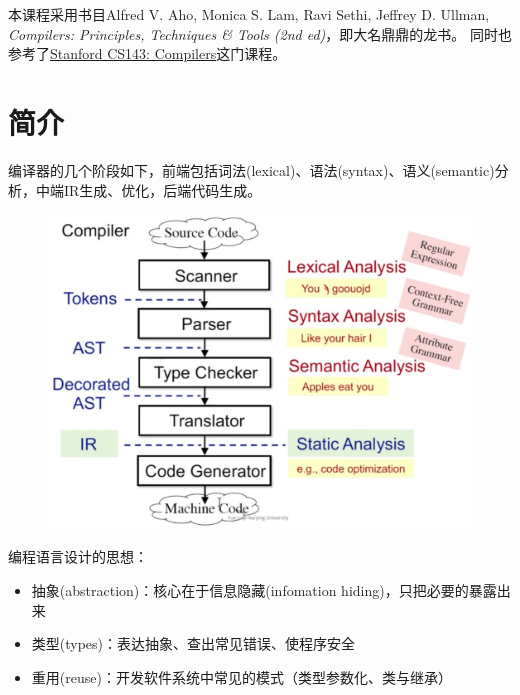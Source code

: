 
本课程采用书目Alfred V. Aho, Monica S. Lam, Ravi Sethi, Jeffrey D. Ullman, \emph{Compilers: Principles, Techniques \& Tools (2nd ed)}，即大名鼎鼎的龙书。
同时也参考了\href{http://web.stanford.edu/class/cs143/}{Stanford CS143: Compilers}这门课程。

\section{简介}
编译器的几个阶段如下，前端包括词法(lexical)、语法(syntax)、语义(semantic)分析，中端IR生成、优化，后端代码生成。
\begin{figure}[H]
\centering
\includegraphics[width=0.6\linewidth]{fig/compiler_flow.jpg}
\end{figure}

编程语言设计的思想：
\begin{itemize}
	\item 抽象(abstraction)：核心在于信息隐藏(infomation hiding)，只把必要的暴露出来
	\item 类型(types)：表达抽象、查出常见错误、使程序安全
	\item 重用(reuse)：开发软件系统中常见的模式（类型参数化、类与继承）
\end{itemize}
